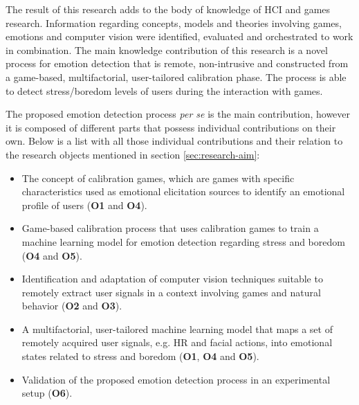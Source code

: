 The result of this research adds to the body of knowledge of HCI and games research. Information regarding concepts, models and theories involving games, emotions and computer vision were identified, evaluated and orchestrated to work in combination. The main knowledge contribution of this research is a novel process for emotion detection that is remote, non-intrusive and constructed from a game-based, multifactorial, user-tailored calibration phase. The process is able to detect stress/boredom levels of users during the interaction with games.

The proposed emotion detection process \textit{per se} is the main contribution, however it is composed of different parts that possess individual contributions on their own. Below is a list with all those individual contributions and their relation to the research objects mentioned in section \ref{sec:research-aim}:

\begin{itemize}
  \item The concept of calibration games, which are games with specific characteristics used as emotional elicitation sources to identify an emotional profile of users (\textbf{O1} and \textbf{O4}).
  \item Game-based calibration process that uses calibration games to train a machine learning model for emotion detection regarding stress and boredom (\textbf{O4} and \textbf{O5}).
  \item Identification and adaptation of computer vision techniques suitable to remotely extract user signals in a context involving games and natural behavior (\textbf{O2} and \textbf{O3}).
  \item A multifactorial, user-tailored machine learning model that maps a set of remotely acquired user signals, e.g. HR and facial actions, into emotional states related to stress and boredom (\textbf{O1}, \textbf{O4} and \textbf{O5}).
  \item Validation of the proposed emotion detection process in an experimental setup (\textbf{O6}).
\end{itemize}

